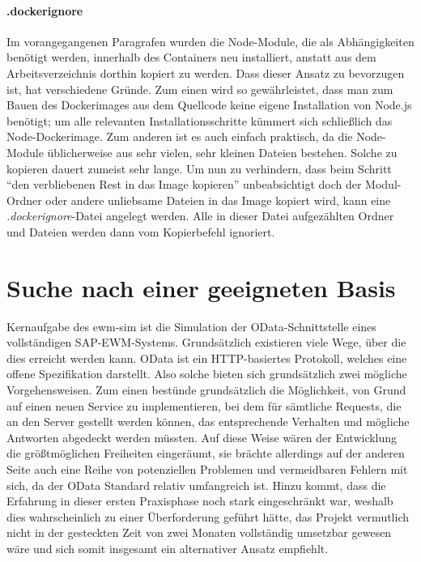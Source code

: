 \paragraph{.dockerignore}
Im vorangegangenen Paragrafen wurden die Node-Module, die als Abhängigkeiten benötigt werden, innerhalb des Containers neu installiert, anstatt aus dem Arbeitsverzeichnis dorthin kopiert zu werden.
Dass dieser Ansatz zu bevorzugen ist, hat verschiedene Gründe.
Zum einen wird so gewährleistet, dass man zum Bauen des Dockerimages aus dem Quellcode keine eigene Installation von Node.js benötigt; um alle relevanten Installationsschritte kümmert sich schließlich das Node-Dockerimage.
Zum anderen ist es auch einfach praktisch, da die Node-Module üblicherweise aus sehr vielen, sehr kleinen Dateien bestehen.
Solche zu kopieren dauert zumeist sehr lange.
Um nun zu verhindern, dass beim Schritt \enquote{den verbliebenen Rest in das Image kopieren} unbeabsichtigt doch der Modul-Ordner oder andere unliebsame Dateien in das Image kopiert wird, kann eine \emph{.dockerignore}-Datei angelegt werden.
Alle in dieser Datei aufgezählten Ordner und Dateien werden dann vom Kopierbefehl ignoriert.~\cite{dockerignore}



\section{Suche nach einer geeigneten Basis}
Kernaufgabe des \ac{ewm-sim} ist die Simulation der \ac{OData}-Schnittstelle eines vollständigen SAP-\ac{EWM}-Systems.
Grundsätzlich existieren viele Wege, über die dies erreicht werden kann.
\ac{OData} ist ein \ac{HTTP}-basiertes Protokoll, welches eine offene Spezifikation darstellt.
Also solche bieten sich grundsätzlich zwei mögliche Vorgehensweisen.
Zum einen bestünde grundsätzlich die Möglichkeit, von Grund auf einen neuen Service zu implementieren, bei dem für sämtliche Requests, die an den Server gestellt werden können, das entsprechende Verhalten und mögliche Antworten abgedeckt werden müssten.
Auf diese Weise wären der Entwicklung die größtmöglichen Freiheiten eingeräumt, sie brächte allerdings auf der anderen Seite auch eine Reihe von potenziellen Problemen und vermeidbaren Fehlern mit sich, da der \ac{OData} Standard relativ umfangreich ist.
Hinzu kommt, dass die Erfahrung in dieser ersten Praxisphase noch stark eingeschränkt war, weshalb dies wahrscheinlich zu einer Überforderung geführt hätte, das Projekt vermutlich nicht in der gesteckten Zeit von zwei Monaten vollständig umsetzbar gewesen wäre und sich somit insgesamt ein alternativer Ansatz empfiehlt.

